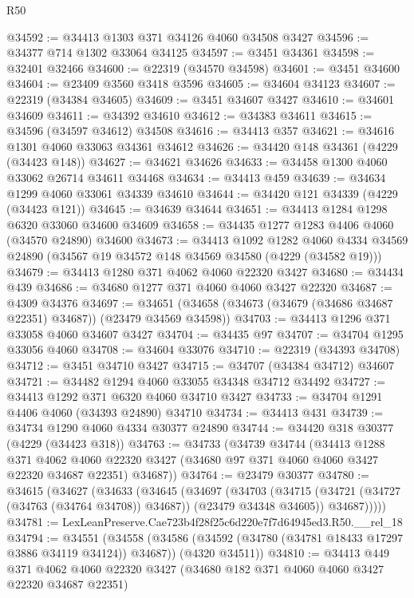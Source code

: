 \begin{lexlean}{R50}
\begin{coremodule}
@34592 := @34413 @1303 @371 @34126 @4060 @34508 @3427
@34596 := @34377 @714 @1302 @33064 @34125
@34597 := @3451 @34361
@34598 := @32401 @32466
@34600 := @22319 (@34570 @34598)
@34601 := @3451 @34600
@34604 := @23409 @3560 @3418 @3596
@34605 := @34604 @34123
@34607 := @22319 (@34384 @34605)
@34609 := @3451 @34607 @3427
@34610 := @34601 @34609
@34611 := @34392 @34610
@34612 := @34383 @34611
@34615 := @34596 (@34597 @34612) @34508
@34616 := @34413 @357
@34621 := @34616 @1301 @4060 @33063 @34361 @34612
@34626 := @34420 @148 @34361 (@4229 (@34423 @148))
@34627 := @34621 @34626
@34633 := @34458 @1300 @4060 @33062 @26714 @34611 @34468
@34634 := @34413 @459
@34639 := @34634 @1299 @4060 @33061 @34339 @34610
@34644 := @34420 @121 @34339 (@4229 (@34423 @121))
@34645 := @34639 @34644
@34651 := @34413 @1284 @1298 @6320 @33060 @34600 @34609
@34658 := @34435 @1277 @1283 @4406 @4060 (@34570 @24890) @34600
@34673 := @34413
    @1092
    @1282
    @4060
    @4334
    @34569
    @24890
    (@34567 @19 @34572 @148 @34569 @34580 (@4229 (@34582 @19)))
@34679 := @34413 @1280 @371 @4062 @4060 @22320 @3427
@34680 := @34434 @439
@34686 := @34680 @1277 @371 @4060 @4060 @3427 @22320
@34687 := @4309 @34376
@34697 := @34651 (@34658 (@34673 (@34679 (@34686 @34687 @22351) @34687)) (@23479 @34569 @34598))
@34703 := @34413 @1296 @371 @33058 @4060 @34607 @3427
@34704 := @34435 @97
@34707 := @34704 @1295 @33056 @4060
@34708 := @34604 @33076
@34710 := @22319 (@34393 @34708)
@34712 := @3451 @34710 @3427
@34715 := @34707 (@34384 @34712) @34607
@34721 := @34482 @1294 @4060 @33055 @34348 @34712 @34492
@34727 := @34413 @1292 @371 @6320 @4060 @34710 @3427
@34733 := @34704 @1291 @4406 @4060 (@34393 @24890) @34710
@34734 := @34413 @431
@34739 := @34734 @1290 @4060 @4334 @30377 @24890
@34744 := @34420 @318 @30377 (@4229 (@34423 @318))
@34763 := @34733
    (@34739
      @34744
      (@34413
        @1288
        @371
        @4062
        @4060
        @22320
        @3427
        (@34680 @97 @371 @4060 @4060 @3427 @22320 @34687 @22351)
        @34687))
@34764 := @23479 @30377
@34780 := @34615
    (@34627
      (@34633
        (@34645
          (@34697
            (@34703
              (@34715 (@34721 (@34727 (@34763 (@34764 @34708)) @34687)) (@23479 @34348 @34605))
              @34687)))))
@34781 := LexLeanPreserve.Cae723b4f28f25c6d220e7f7d64945ed3.R50.__rel_18
@34794 := @34551
    (@34558
      (@34586 (@34592 (@34780 (@34781 @18433 @17297 @3886 @34119 @34124)) @34687))
      (@4320 @34511))
@34810 := @34413
    @449
    @371
    @4062
    @4060
    @22320
    @3427
    (@34680 @182 @371 @4060 @4060 @3427 @22320 @34687 @22351)

\end{coremodule}
\end{lexlean}
